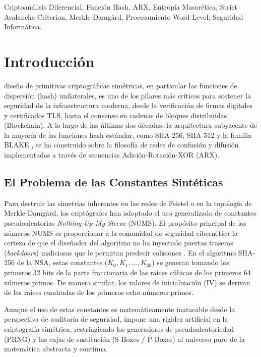 \documentclass[10pt,journal,compsoc]{IEEEtran}
\begin{document}
{\begin{IEEEkeywords}
Criptoanálisis Diferencial, Función Hash, ARX, Entropía Masorética, Strict Avalanche Criterion, Merkle-Damgård, Procesamiento Word-Level, Seguridad Informática.
\end{IEEEkeywords}}

\maketitle
\IEEEdisplaynontitleabstractindextext
\IEEEpeerreviewmaketitle

\section{Introducción}
 diseño de primitivas criptográficas simétricas, en particular las funciones de dispersión (hash) unilaterales, es uno de los pilares más críticos para sostener la seguridad de la infraestructura moderna, desde la verificación de firmas digitales y certificados TLS, hasta el consenso en cadenas de bloques distribuidas (Blockchain). A lo largo de las últimas dos décadas, la arquitectura subyacente de la mayoría de las funciones hash estándar, como SHA-256, SHA-512 \cite{fips180} y la familia BLAKE \cite{aumasson2013blake2}, se ha construido sobre la filosofía de redes de confusión y difusión implementadas a través de secuencias Adición-Rotación-XOR (ARX). 

\subsection{El Problema de las Constantes Sintéticas}
Para destruir las simetrías inherentes en las redes de Feistel o en la topología de Merkle-Damgård, los criptógrafos han adoptado el uso generalizado de constantes pseudoaleatorias \textit{Nothing-Up-My-Sleeve} (NUMS). El propósito principal de los números NUMS es proporcionar a la comunidad de seguridad cibernética la certeza de que el diseñador del algoritmo no ha inyectado puertas traseras (\textit{backdoors}) maliciosas que le permitan predecir colisiones \cite{schneier1996applied}. En el algoritmo SHA-256 de la NSA, estas constantes ($K_0, K_1, \dots, K_{63}$) se generan tomando los primeros 32 bits de la parte fraccionaria de las raíces cúbicas de los primeros 64 números primos. De manera similar, los valores de inicialización (IV) se derivan de las raíces cuadradas de los primeros ocho números primos.

Aunque el uso de estas constantes es matemáticamente inatacable desde la perspectiva de auditoría de seguridad, impone una rigidez artificial en la criptografía simétrica, restringiendo los generadores de pseudoaleatoriedad (PRNG) y las cajas de sustitución (S-Boxes / P-Boxes) al universo puro de la matemática abstracta y continua.
\end{document}

